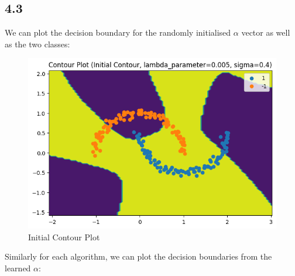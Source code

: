 \documentclass[12pt]{article}
\begin{document}
\subsection*{4.3}

We can plot the decision boundary for the randomly initialised $\alpha$ vector as well as the two classes:

\begin{figure}[h]
\centering
\includegraphics[scale=0.35]{outputs/part_4/initial-contour}
\caption{Initial Contour Plot}
\label{fig:}
\end{figure}

Similarly for each algorithm, we can plot the decision boundaries from the learned $\alpha$:
\end{document}
